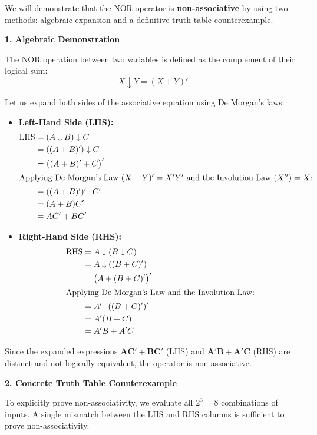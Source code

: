 \documentclass[12pt,a3paper]{article}
\begin{document}
\begin{enumerate}
\begin{tcolorbox}[enhanced,breakable,ansbox,colback=cA!4,colframe=cA,boxrule=0.8pt,arc=5pt,title={\textbf{Answer}},fonttitle=\bfseries\color{white},colbacktitle=cA]
We will demonstrate that the NOR operator is \textbf{non-associative} by using two methods: algebraic expansion and a definitive truth-table counterexample.

\vspace{0.3cm}
\textbf{1. Algebraic Demonstration}

The NOR operation between two variables is defined as the complement of their logical sum: 
\[ X \downarrow Y = (X + Y)' \]

Let us expand both sides of the associative equation using De Morgan's laws:

\begin{itemize}
    \item \textbf{Left-Hand Side (LHS):}
    \begin{align*}
    \text{LHS} &= (A \downarrow B) \downarrow C \\
    &= ((A + B)') \downarrow C \\
    &= \big((A + B)' + C\big)' \\
    \intertext{Applying De Morgan's Law $(X+Y)' = X'Y'$ and the Involution Law $(X'') = X$:}
    &= ((A + B)')' \cdot C' \\
    &= (A + B)C' \\
    &= AC' + BC'
    \end{align*}

    \item \textbf{Right-Hand Side (RHS):}
    \begin{align*}
    \text{RHS} &= A \downarrow (B \downarrow C) \\
    &= A \downarrow ((B + C)') \\
    &= \big(A + (B + C)'\big)' \\
    \intertext{Applying De Morgan's Law and the Involution Law:}
    &= A' \cdot ((B + C)')' \\
    &= A'(B + C) \\
    &= A'B + A'C
    \end{align*}
\end{itemize}

Since the expanded expressions $\mathbf{AC' + BC'}$ (LHS) and $\mathbf{A'B + A'C}$ (RHS) are distinct and not logically equivalent, the operator is non-associative.

\vspace{0.4cm}
\textbf{2. Concrete Truth Table Counterexample}

To explicitly prove non-associativity, we evaluate all $2^3 = 8$ combinations of inputs. A single mismatch between the LHS and RHS columns is sufficient to prove non-associativity.


\end{tcolorbox}
\end{enumerate}
\end{document}
